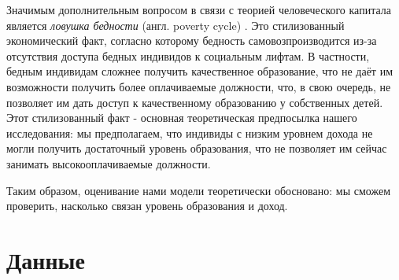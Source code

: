 \documentclass[a4paper]{article}
\begin{document}
Значимым дополнительным вопросом в связи с теорией человеческого капитала является \textit{ловушка бедности} (англ. poverty cycle) \cite[Goldin, 2016]{Goldin}. Это стилизованный экономический факт, согласно которому бедность самовозпроизводится из-за отсутствия доступа бедных индивидов к социальным лифтам. В частности, бедным индивидам сложнее получить качественное образование, что не даёт им возможности получить более оплачиваемые должности, что, в свою очередь, не позволяет им дать доступ к качественному образованию у собственных детей. Этот стилизованный факт - основная теоретическая предпосылка нашего исследования: мы предполагаем, что индивиды с низким уровнем дохода не могли получить достаточный уровень образования, что не позволяет им сейчас занимать высокооплачиваемые должности. 

Таким образом, оценивание нами модели теоретически обосновано: мы сможем проверить, насколько связан уровень образования и доход. 

\newpage


\section*{Данные}
\end{document}

